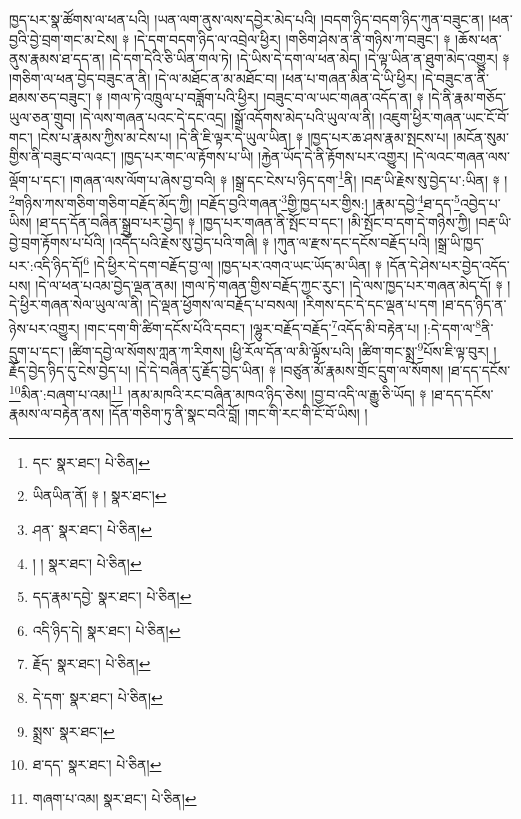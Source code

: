 ཁྱད་པར་སྣ་ཚོགས་ལ་ཕན་པའི། །ཡན་ལག་ནུས་ལས་དབྱེར་མེད་པའི། །བདག་ཉིད་བདག་ཉིད་ཀུན་བཟུང་ན། །ཕན་བྱའི་བྱེ་བྲག་གང་མ་ངེས། ༈ །དེ་དག་བདག་ཉིད་ལ་འབྲེལ་ཕྱིར། །གཅིག་ཤེས་ན་ནི་གཉིས་ཀ་བཟུང་། ༈ །ཆོས་ཕན་ནུས་རྣམས་ཐ་དད་ན། །དེ་དག་དེའི་ཅི་ཡིན་གལ་ཏེ། །དེ་ཡིས་དེ་དག་ལ་ཕན་མེད། །དེ་ལྟ་ཡིན་ན་ཐུག་མེད་འགྱུར། ༈ །གཅིག་ལ་ཕན་བྱེད་བཟུང་ན་ནི། །དེ་ལ་མཐོང་ན་མ་མཐོང་བ། །ཕན་པ་གཞན་མིན་དེ་ཡི་ཕྱིར། །དེ་བཟུང་ན་ནི་ཐམས་ཅད་བཟུང་། ༈ །གལ་ཏེ་འཁྲུལ་པ་བཟློག་པའི་ཕྱིར། །བཟུང་བ་ལ་ཡང་གཞན་འདོད་ན། ༈ །དེ་ནི་རྣམ་གཅོད་ཡུལ་ཅན་གྲུབ། །དེ་ལས་གཞན་པའང་དེ་དང་འདྲ། །སྒྲོ་འདོགས་མེད་པའི་ཡུལ་ལ་ནི། །འཇུག་ཕྱིར་གཞན་ཡང་ངོ་བོ་གང་། །ངེས་པ་རྣམས་ཀྱིས་མ་ངེས་པ། །དེ་ནི་ཇི་ལྟར་དེ་ཡུལ་ཡིན། ༈ །ཁྱད་པར་ཆ་ཤས་རྣམ་སྤངས་པ། །མངོན་སུམ་གྱིས་ནི་བཟུང་བ་ལའང་། །ཁྱད་པར་གང་ལ་རྟོགས་པ་ཡི། །རྐྱེན་ཡོད་དེ་ནི་རྟོགས་པར་འགྱུར། །དེ་ལའང་གཞན་ལས་ལྡོག་པ་དང་། །གཞན་ལས་ལོག་པ་ཞེས་བྱ་བའི། ༈ །སྒྲ་དང་ངེས་པ་ཉིད་དག་\footnote{དང་  སྣར་ཐང་།  པེ་ཅིན། }ནི། །བརྡ་ཡི་རྗེས་སུ་བྱེད་པ་:ཡིན། ༈ །\footnote{ཡིནཡིན་ནོ། ༈ །  སྣར་ཐང་། }གཉིས་ཀས་གཅིག་གཅིག་བརྗོད་མོད་ཀྱི། །བརྗོད་བྱའི་གཞན་\footnote{ཤན་  སྣར་ཐང་།  པེ་ཅིན། }གྱི་ཁྱད་པར་གྱིས:། །རྣམ་དབྱེ་\footnote{། །  སྣར་ཐང་།  པེ་ཅིན། }ཐ་དད་\footnote{དད་རྣམ་དབྱེ་  སྣར་ཐང་།  པེ་ཅིན། }འབྱེད་པ་ཡིས། །ཐ་དད་དོན་བཞིན་སྒྲུབ་པར་བྱེད། ༈ །ཁྱད་པར་གཞན་ནི་སྤོང་བ་དང་། །མི་སྤོང་བ་དག་དེ་གཉིས་ཀྱི། །བརྡ་ཡི་བྱེ་བྲག་རྟོགས་པ་པོའི། །འདོད་པའི་རྗེས་སུ་བྱེད་པའི་གཞི། ༈ །ཀུན་ལ་རྫས་དང་དངོས་བརྗོད་པའི། །སྒྲ་ཡི་ཁྱད་པར་:འདི་ཉིད་དོ།\footnote{འདི་ཉིད་དེ།  སྣར་ཐང་།  པེ་ཅིན། } །དེ་ཕྱིར་དེ་དག་བརྗོད་བྱ་ལ། །ཁྱད་པར་འགའ་ཡང་ཡོད་མ་ཡིན། ༈ །དོན་དེ་ཤེས་པར་བྱེད་འདོད་པས། །དེ་ལ་ཕན་པའམ་བྱེད་ལྡན་ནམ། །གལ་ཏེ་གཞན་གྱིས་བརྗོད་ཀྱང་རུང་། །དེ་ལས་ཁྱད་པར་གཞན་མེད་དོ། ༈ །དེ་ཕྱིར་གཞན་སེལ་ཡུལ་ལ་ནི། །དེ་ལྡན་ཕྱོགས་ལ་བརྗོད་པ་བསལ། །རིགས་དང་དེ་དང་ལྡན་པ་དག །ཐ་དད་ཉིད་ན་ཉེས་པར་འགྱུར། །གང་དག་གི་ཚིག་དངོས་པོའི་དབང་། །ལྷུར་བརྗོད་བརྗོད་\footnote{རྗོད་  སྣར་ཐང་།  པེ་ཅིན། }འདོད་མི་བརྟེན་པ། །:དེ་དག་ལ་\footnote{དེ་དག་  སྣར་ཐང་།  པེ་ཅིན། }ནི་དྲུག་པ་དང་། །ཚིག་དབྱེ་ལ་སོགས་ཀླན་ཀ་རིགས། །ཕྱི་རོལ་དོན་ལ་མི་ལྟོས་པའི། །ཚིག་གང་སྨྲ་\footnote{སྨྲས་  སྣར་ཐང་། }པོས་ཇི་ལྟ་བུར། །རྗོད་བྱེད་ཉིད་དུ་ངེས་བྱེད་པ། །དེ་དེ་བཞིན་དུ་རྗོད་བྱེད་ཡིན། ༈ །བཙུན་མོ་རྣམས་གྲོང་དྲུག་ལ་སོགས། །ཐ་དད་དངོས་\footnote{ཐ་དད་  སྣར་ཐང་།  པེ་ཅིན། }མིན་:བཞག་པ་འམ།\footnote{གཞག་པ་འམ།  སྣར་ཐང་།  པེ་ཅིན། } །ནམ་མཁའི་རང་བཞིན་མཁའ་ཉིད་ཅེས། །བྱ་བ་འདི་ལ་རྒྱུ་ཅི་ཡོད། ༈ །ཐ་དད་དངོས་རྣམས་ལ་བརྟེན་ནས། །དོན་གཅིག་ཏུ་ནི་སྣང་བའི་བློ། །གང་གི་རང་གི་ངོ་བོ་ཡིས། །
